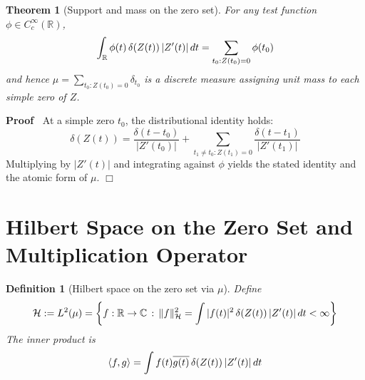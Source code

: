 \documentclass{article}
\newcommand{\assign}{:=}
\newenvironment{proof}{\noindent\textbf{Proof\ }}{\hspace*{\fill}$\Box$\medskip}
\newcounter{nndefinition}
\newtheorem{definition*}[nndefinition]{Definition}
\newtheorem{theorem}{Theorem}
\begin{document}
\begin{theorem}
  [Support and mass on the zero set] For any test function $\phi \in
  C_c^{\infty} (\mathbb{R})$,
  \begin{equation}
    \int_{\mathbb{R}} \phi (t)  \hspace{0.17em} \delta (Z (t)) \hspace{0.17em}
    |Z' (t) |  \hspace{0.17em} dt = \sum_{t_0 : Z (t_0) = 0} \phi (t_0)
  \end{equation}
  and hence $\mu = \sum_{t_0 : Z (t_0) = 0} \delta_{t_0}$ is a discrete
  measure assigning unit mass to each simple zero of $Z$.
\end{theorem}

\begin{proof}
  At a simple zero $t_0$, the distributional identity holds:
  \begin{equation}
    \delta (Z (t)) = \frac{\delta (t - t_0)}{|Z' (t_0) |} + \sum_{t_1 \neq t_0
    : Z (t_1) = 0} \frac{\delta (t - t_1)}{|Z' (t_1) |}
  \end{equation}
  Multiplying by $|Z' (t) |$ and integrating against $\phi$ yields the stated
  identity and the atomic form of $\mu$.
\end{proof}

\section{Hilbert Space on the Zero Set and Multiplication Operator}

\begin{definition*}
  [Hilbert space on the zero set via $\mu$] Define
  \begin{equation}
    \mathcal{H} \assign L^2 (\mu) = \left\{ f : \mathbb{R} \to \mathbb{C}
    \hspace{0.17em} : \hspace{0.17em} \|f\|_{\mathcal{H}}^2 = \int |f (t) |^2 
    \hspace{0.17em} \delta (Z (t)) \hspace{0.17em} |Z' (t) | \hspace{0.17em}
    dt < \infty \right\}
  \end{equation}
  The inner product is
  \begin{equation}
    \langle f, g \rangle = \int f (t) \overline{g (t)} \hspace{0.17em} \delta
    (Z (t)) \hspace{0.17em} |Z' (t) |  \hspace{0.17em} dt
  \end{equation}
\end{definition*}
\end{document}
